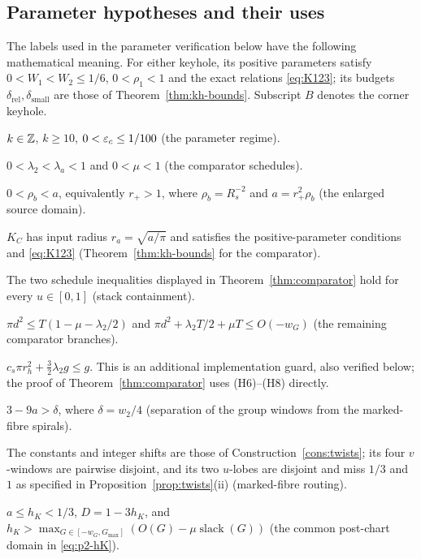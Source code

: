 \subsection{Parameter hypotheses and their uses}\label{sec:hypotheses}

The labels used in the parameter verification below have the following mathematical meaning. For either keyhole,
its positive parameters satisfy $0<W_1<W_2\le1/6$, $0<\rho_1<1$ and the exact relations
\eqref{eq:K123}; its budgets $\delta_{\mathrm{rel}},\delta_{\mathrm{small}}$ are those of
Theorem~\ref{thm:kh-bounds}. Subscript $B$ denotes the corner keyhole.

\begin{description}[leftmargin=4em,labelwidth=3.5em]
\item[(H0)] $k\in\mathbb{Z}$, $k\ge10$, $0<\varepsilon_c\le1/100$ (the parameter regime).
\item[(H1)] $0<\lambda_2<\lambda_a<1$ and $0<\mu<1$ (the comparator schedules).
\item[(H2)] $0<\rho_b<a$, equivalently $r_+>1$, where $\rho_b=R_s^{-2}$ and $a=r_+^2\rho_b$
(the enlarged source domain).
\item[(H3)--(H5)] $K_C$ has input radius $r_a=\sqrt{a/\pi}$ and satisfies the positive-parameter conditions and
\eqref{eq:K123} (Theorem~\ref{thm:kh-bounds} for the comparator).
\item[(H6)--(H7)] The two schedule inequalities displayed in Theorem~\ref{thm:comparator} hold for every
$u\in[0,1]$ (stack containment).
\item[(H8)] $\pi d^2\le T(1-\mu-\lambda_2/2)$ and
$\pi d^2+\lambda_2T/2+\mu T\le O(-w_G)$ (the remaining comparator branches).
\item[(H9)] $c_s\pi r_h^2+\frac32\lambda_2g\le g$. This is an additional implementation guard, also verified
below; the proof of Theorem~\ref{thm:comparator} uses (H6)--(H8) directly.
\item[(H9b)] $3-9a>\delta$, where $\delta=w_2/4$ (separation of the group windows from the marked-fibre spirals).
\item[(H10)] The constants and integer shifts are those of Construction~\ref{cons:twists}; its four $v$-windows
are pairwise disjoint, and its two $u$-lobes are disjoint and miss $1/3$ and $1$ as specified in
Proposition~\ref{prop:twists}(ii) (marked-fibre routing).
\item[(H11)] $a\le h_K<1/3$, $D=1-3h_K$, and
$h_K>\max_{G\in[-w_G,G_{\max}]}(O(G)-\mu\operatorname{slack}(G))$
(the common post-chart domain in \eqref{eq:p2-hK}).

\end{description}
